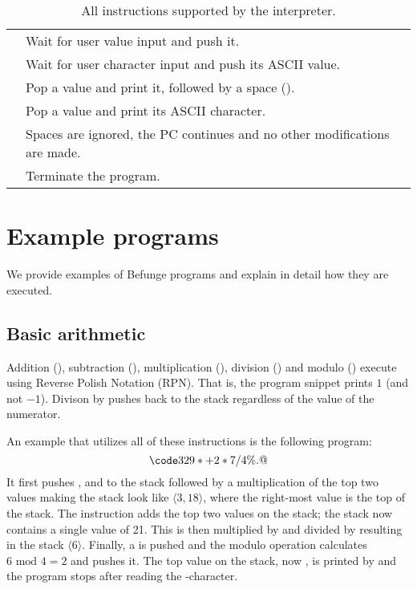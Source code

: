 \documentclass[12pt, a4paper]{article}
\begin{document}
\begin{table}[!ht]
\begin{tabular}{r|l}
\code{\&} & Wait for user value input and push it.\\
\code{\textasciitilde} & Wait for user character input and push its ASCII value.\\
\code{.} & Pop a value and print it, followed by a space (\textvisiblespace).\\
\code{,} & Pop a value and print its ASCII character.\\
\code{\textvisiblespace} & Spaces are ignored, the PC continues and no other modifications are made. \\
\code{@} & Terminate the program.
\begin{comment}
\end{comment}
\end{tabular}
\caption{All instructions supported by the interpreter.}
\label{tab:instr}
\end{table}

\section{Example programs}
\label{sec:examples}

We provide examples of Befunge programs and explain in detail how they are executed.

\subsection{Basic arithmetic}
\label{sec:arith}

Addition (\code{+}), subtraction (\code{-}), multiplication (\code{*}), division (\code{/}) and modulo (\code{\%}) execute using Reverse Polish Notation (RPN). That is, the program snippet  prints $1$ (and not $-1$). Divison by  pushes  back to the stack regardless of the value of the numerator.

An example that utilizes all of these instructions is the following program:
$$\code{329*+2*7/4\%.@}$$
It first pushes ,  and  to the stack followed by a multiplication of the top two values making the stack look like $\langle 3, 18 \rangle$, where the right-most value is the top of the stack. The \code{+} instruction adds the top two values on the stack; the stack now contains a single value of 21. This is then multiplied by  and divided by  resulting in the stack $\langle 6 \rangle$. Finally, a  is pushed and the modulo operation \code{\%} calculates $6 \text{ mod } 4 = 2$ and pushes it. The top value on the stack, now , is printed by  and the program stops after reading the -character.
\end{document}
